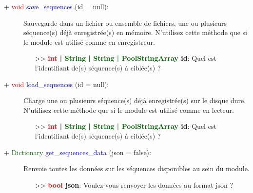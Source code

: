 \documentclass[a4paper, 11pt]{article}
\begin{document}
	\begin{description}
		\item [+ \textcolor{red}{void} \textcolor{blue}{save\_sequences} (id = null):] Sauvegarde dans un 
		fichier ou ensemble de fichiers, une ou plusieurs séquence(s) déjà enregistrée(s) en mémoire. 
		N'utilisez cette méthode que si le module est utilisé comme en enregistreur.
		\begin{itemize}
			\item [>> \textbf{\textcolor{red}{int} | \textcolor{darkgreen}{String | String | 
			PoolStringArray} id}:] Quel est l'identifiant de(s) séquence(s) à ciblée(s) ?\\
		\end{itemize}
	\end{description}
	\begin{description}
		\item [+ \textcolor{red}{void} \textcolor{blue}{load\_sequences} (id = null):] Charge une ou
		plusieurs séquence(s) déjà enregistrée(s) sur le disque dure. N'utilisez cette méthode que si le
		module est utilisé comme en lecteur.
		\begin{itemize}
			\item [>> \textbf{\textcolor{red}{int} | \textcolor{darkgreen}{String | String | 
			PoolStringArray} id}:] Quel est l'identifiant de(s) séquence(s) à ciblée(s) ?\\
		\end{itemize}
	\end{description}
	\begin{description}
		\item [+ \textcolor{darkgreen}{Dictionary} \textcolor{blue}{get\_sequences\_data} (json = false):] 
		Renvoie toutes les données sur les séquences disponibles au sein du module.
		\begin{itemize}
			\item [>> \textbf{\textcolor{red}{bool} json}:] Voulez-vous renvoyer les données au format json 
			?
		\end{itemize}
	\end{description}

\end{document}
